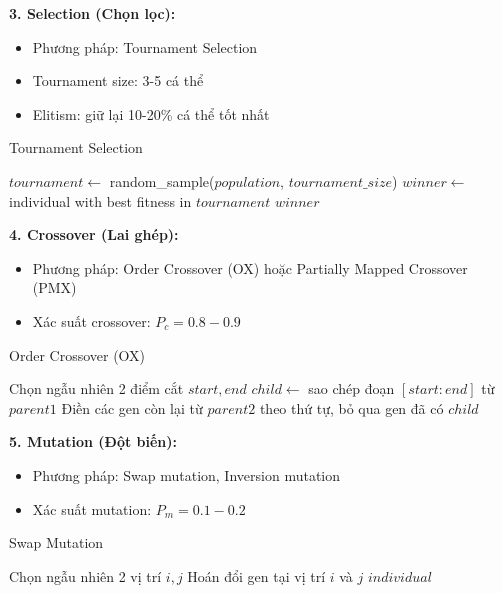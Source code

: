 \documentclass[12pt,a4paper]{article}
\begin{document}
\textbf{3. Selection (Chọn lọc):}
\begin{itemize}
    \item Phương pháp: Tournament Selection
    \item Tournament size: 3-5 cá thể
    \item Elitism: giữ lại 10-20\% cá thể tốt nhất
\end{itemize}

\begin{algorithm}
\caption{Tournament Selection}
\begin{algorithmic}[1]
    \State $tournament \gets$ random\_sample($population$, $tournament\_size$)
    \State $winner \gets$ individual with best fitness in $tournament$
    \State \Return $winner$
\EndFunction
\end{algorithmic}
\end{algorithm}

\textbf{4. Crossover (Lai ghép):}
\begin{itemize}
    \item Phương pháp: Order Crossover (OX) hoặc Partially Mapped Crossover (PMX)
    \item Xác suất crossover: $P_c = 0.8 - 0.9$
\end{itemize}

\begin{algorithm}
\caption{Order Crossover (OX)}
\begin{algorithmic}[1]
    \State Chọn ngẫu nhiên 2 điểm cắt $start, end$
    \State $child \gets$ sao chép đoạn $[start:end]$ từ $parent1$
    \State Điền các gen còn lại từ $parent2$ theo thứ tự, bỏ qua gen đã có
    \State \Return $child$
\EndFunction
\end{algorithmic}
\end{algorithm}

\textbf{5. Mutation (Đột biến):}
\begin{itemize}
    \item Phương pháp: Swap mutation, Inversion mutation
    \item Xác suất mutation: $P_m = 0.1 - 0.2$
\end{itemize}

\begin{algorithm}
\caption{Swap Mutation}
\begin{algorithmic}[1]
    \State Chọn ngẫu nhiên 2 vị trí $i, j$
    \State Hoán đổi gen tại vị trí $i$ và $j$
    \State \Return $individual$
\EndFunction
\end{algorithmic}
\end{algorithm}
\end{document}
